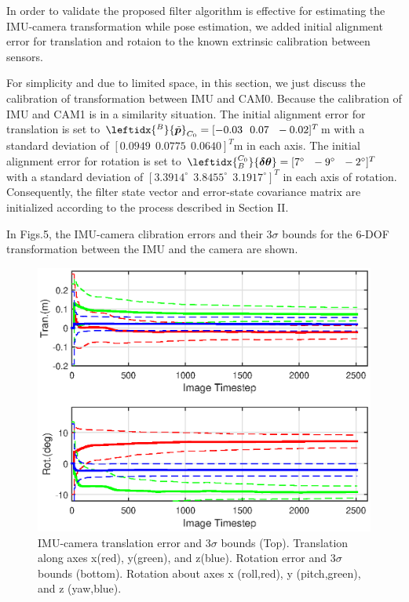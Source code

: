 \documentclass[a4paper, 10pt, conference]{ieeeconf}      %
\begin{document}
In order to validate the proposed filter algorithm is effective for estimating the IMU-camera transformation  while pose estimation, we added initial alignment error for translation and rotaion to the known extrinsic  calibration between sensors. 

For simplicity and due to limited space, in this section, we just discuss the calibration of transformation between IMU and CAM0. Because the calibration of IMU and CAM1 is in a similarity situation. The initial alignment error for translation is set to $ {\leftidx{^B}{\tilde  {\bm p}}_{C_0}} = [-0.03 \ \ 0.07 \ \ -0.02]^T $m with a  standard deviation of $ [0.0949  \ \   0.0775  \ \  0.0640]^T $m in each axis. The initial alignment error for rotation is set to $ \leftidx{_B^{C_0}} { \bm {\delta \theta}} = [7^{\circ} \ \ -9^{\circ} \ \ -2^{\circ}]^T $ with a standard deviation of  $ [3.3914^{\circ}  \ \  3.8455^{\circ}  \ \  3.1917^{\circ}]^T $ in each axis of rotation. Consequently, the filter state vector and
error-state covariance matrix are initialized according to the
process described in Section II.





In Figs.5, the  IMU-camera clibration errors and their $ 3 \sigma $ bounds for the
6-DOF transformation between the IMU and the camera are shown.

\begin{figure}[thpb]
	\centering
	
	\includegraphics[scale=0.5]{extrinsic.eps}
	
	\caption{IMU-camera translation error and $ 3 \sigma $ bounds (Top). Translation along axes x(red), y(green), and z(blue). Rotation error and $ 3 \sigma $ bounds (bottom). Rotation about axes x (roll,red), y (pitch,green), and z (yaw,blue).  }
	\label{figurelabel}
\end{figure}
\end{document}
